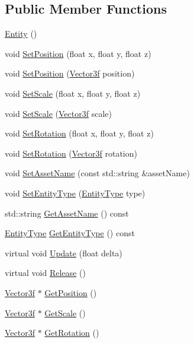 \subsection*{Public Member Functions}
\begin{DoxyCompactItemize}
\item 
\mbox{\hyperlink{classse_1_1_entity_ac92492302d50c22ba7c4e9ff016b6145}{Entity}} ()
\item 
void \mbox{\hyperlink{classse_1_1_entity_a09e198e70620f231106d9f375f7598f3}{Set\+Position}} (float x, float y, float z)
\item 
void \mbox{\hyperlink{classse_1_1_entity_ae0d37a4774afab2b7abf4118efc57499}{Set\+Position}} (\mbox{\hyperlink{namespacese_a12e07512d95e2fdebdaf74a5ea2cf5f6}{Vector3f}} position)
\item 
void \mbox{\hyperlink{classse_1_1_entity_a812b63adcbf5f1a3e429a31c6e0ff940}{Set\+Scale}} (float x, float y, float z)
\item 
void \mbox{\hyperlink{classse_1_1_entity_a70df7cdf2d72ff4d767033c2994b673f}{Set\+Scale}} (\mbox{\hyperlink{namespacese_a12e07512d95e2fdebdaf74a5ea2cf5f6}{Vector3f}} scale)
\item 
void \mbox{\hyperlink{classse_1_1_entity_a41f820b99b2b6d76c97472dcddca7fa2}{Set\+Rotation}} (float x, float y, float z)
\item 
void \mbox{\hyperlink{classse_1_1_entity_a950373cfaaad7ad4bba06f3ab8534efd}{Set\+Rotation}} (\mbox{\hyperlink{namespacese_a12e07512d95e2fdebdaf74a5ea2cf5f6}{Vector3f}} rotation)
\item 
void \mbox{\hyperlink{classse_1_1_entity_a4fcf5639a2e6e74e0b12893e70a46a83}{Set\+Asset\+Name}} (const std\+::string \&asset\+Name)
\item 
void \mbox{\hyperlink{classse_1_1_entity_a0550faa593742dbd41284971c24c410e}{Set\+Entity\+Type}} (\mbox{\hyperlink{namespacese_ae73a909a94998bc95235eb9b16e405f1}{Entity\+Type}} type)
\item 
std\+::string \mbox{\hyperlink{classse_1_1_entity_af1d512cba984ffe167decd7ecf7a88f4}{Get\+Asset\+Name}} () const
\item 
\mbox{\hyperlink{namespacese_ae73a909a94998bc95235eb9b16e405f1}{Entity\+Type}} \mbox{\hyperlink{classse_1_1_entity_aec26e9fd7f7c4c6d89e1e459a5eb028a}{Get\+Entity\+Type}} () const
\item 
virtual void \mbox{\hyperlink{classse_1_1_entity_a1cd277c4c5a517f5cde8b72d5c40a8f0}{Update}} (float delta)
\item 
virtual void \mbox{\hyperlink{classse_1_1_entity_aac1c64a40d796cfda308aaa88214bf1c}{Release}} ()
\item 
\mbox{\hyperlink{namespacese_a12e07512d95e2fdebdaf74a5ea2cf5f6}{Vector3f}} $\ast$ \mbox{\hyperlink{classse_1_1_entity_ab663eb5602597895c8275e683289e917}{Get\+Position}} ()
\item 
\mbox{\hyperlink{namespacese_a12e07512d95e2fdebdaf74a5ea2cf5f6}{Vector3f}} $\ast$ \mbox{\hyperlink{classse_1_1_entity_a1ef3f16cc61246c13d4c3f94169c4f44}{Get\+Scale}} ()
\item 
\mbox{\hyperlink{namespacese_a12e07512d95e2fdebdaf74a5ea2cf5f6}{Vector3f}} $\ast$ \mbox{\hyperlink{classse_1_1_entity_a52f05222018d86a064cbc2f5c95da203}{Get\+Rotation}} ()
\end{DoxyCompactItemize}
